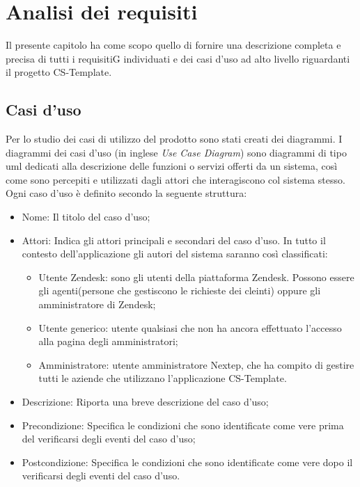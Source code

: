 
\chapter{Analisi dei requisiti}
\label{cap:analisi-requisiti}
Il presente capitolo ha come scopo quello di fornire una descrizione completa e precisa di tutti i requisitiG individuati e dei casi d’uso ad alto livello riguardanti il progetto CS-Template.

\section{Casi d'uso}

Per lo studio dei casi di utilizzo del prodotto sono stati creati dei diagrammi.
I diagrammi dei casi d'uso (in inglese \emph{Use Case Diagram}) sono diagrammi di tipo \gls{uml} dedicati alla descrizione delle funzioni o servizi offerti da un sistema, così come sono percepiti e utilizzati dagli attori che interagiscono col sistema stesso.
Ogni caso d’uso è definito secondo la seguente struttura:
\begin{itemize}
	\item Nome: Il titolo del caso d’uso;
	\item Attori: Indica gli attori principali e secondari del caso d’uso. In tutto il contesto
	dell’applicazione gli autori del sistema saranno così classificati:
	\begin{itemize}
		\item Utente Zendesk: sono gli utenti della piattaforma Zendesk. Possono essere gli agenti(persone che gestiscono le richieste dei cleinti) oppure gli amministratore di Zendesk;
		\item Utente generico: utente qualsiasi che non ha ancora effettuato l'accesso alla pagina degli amministratori;
		 \item Amministratore: utente amministratore Nextep, che ha compito di gestire tutti le aziende che utilizzano l'applicazione CS-Template.
	\end{itemize}

	\item Descrizione: Riporta una breve descrizione del caso d’uso;
	\item Precondizione: Specifica le condizioni che sono identificate come vere prima
	del verificarsi degli eventi del caso d’uso;
	\item Postcondizione: Specifica le condizioni che sono identificate come vere dopo il
	verificarsi degli eventi del caso d’uso.

\end{itemize}

